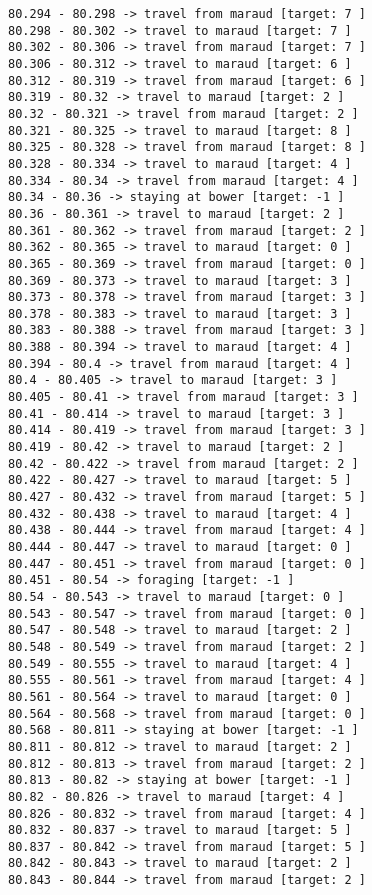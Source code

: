\documentclass[11pt]{article}
\begin{document}
\begin{Verbatim}[commandchars=\\\{\}]
80.294 - 80.298 -> travel from maraud [target: 7 ]
80.298 - 80.302 -> travel to maraud [target: 7 ]
80.302 - 80.306 -> travel from maraud [target: 7 ]
80.306 - 80.312 -> travel to maraud [target: 6 ]
80.312 - 80.319 -> travel from maraud [target: 6 ]
80.319 - 80.32 -> travel to maraud [target: 2 ]
80.32 - 80.321 -> travel from maraud [target: 2 ]
80.321 - 80.325 -> travel to maraud [target: 8 ]
80.325 - 80.328 -> travel from maraud [target: 8 ]
80.328 - 80.334 -> travel to maraud [target: 4 ]
80.334 - 80.34 -> travel from maraud [target: 4 ]
80.34 - 80.36 -> staying at bower [target: -1 ]
80.36 - 80.361 -> travel to maraud [target: 2 ]
80.361 - 80.362 -> travel from maraud [target: 2 ]
80.362 - 80.365 -> travel to maraud [target: 0 ]
80.365 - 80.369 -> travel from maraud [target: 0 ]
80.369 - 80.373 -> travel to maraud [target: 3 ]
80.373 - 80.378 -> travel from maraud [target: 3 ]
80.378 - 80.383 -> travel to maraud [target: 3 ]
80.383 - 80.388 -> travel from maraud [target: 3 ]
80.388 - 80.394 -> travel to maraud [target: 4 ]
80.394 - 80.4 -> travel from maraud [target: 4 ]
80.4 - 80.405 -> travel to maraud [target: 3 ]
80.405 - 80.41 -> travel from maraud [target: 3 ]
80.41 - 80.414 -> travel to maraud [target: 3 ]
80.414 - 80.419 -> travel from maraud [target: 3 ]
80.419 - 80.42 -> travel to maraud [target: 2 ]
80.42 - 80.422 -> travel from maraud [target: 2 ]
80.422 - 80.427 -> travel to maraud [target: 5 ]
80.427 - 80.432 -> travel from maraud [target: 5 ]
80.432 - 80.438 -> travel to maraud [target: 4 ]
80.438 - 80.444 -> travel from maraud [target: 4 ]
80.444 - 80.447 -> travel to maraud [target: 0 ]
80.447 - 80.451 -> travel from maraud [target: 0 ]
80.451 - 80.54 -> foraging [target: -1 ]
80.54 - 80.543 -> travel to maraud [target: 0 ]
80.543 - 80.547 -> travel from maraud [target: 0 ]
80.547 - 80.548 -> travel to maraud [target: 2 ]
80.548 - 80.549 -> travel from maraud [target: 2 ]
80.549 - 80.555 -> travel to maraud [target: 4 ]
80.555 - 80.561 -> travel from maraud [target: 4 ]
80.561 - 80.564 -> travel to maraud [target: 0 ]
80.564 - 80.568 -> travel from maraud [target: 0 ]
80.568 - 80.811 -> staying at bower [target: -1 ]
80.811 - 80.812 -> travel to maraud [target: 2 ]
80.812 - 80.813 -> travel from maraud [target: 2 ]
80.813 - 80.82 -> staying at bower [target: -1 ]
80.82 - 80.826 -> travel to maraud [target: 4 ]
80.826 - 80.832 -> travel from maraud [target: 4 ]
80.832 - 80.837 -> travel to maraud [target: 5 ]
80.837 - 80.842 -> travel from maraud [target: 5 ]
80.842 - 80.843 -> travel to maraud [target: 2 ]
80.843 - 80.844 -> travel from maraud [target: 2 ]

\end{Verbatim}
\end{document}
